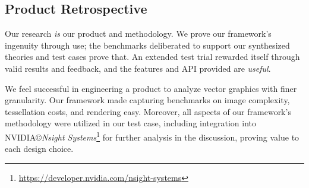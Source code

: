 \subsection{Product Retrospective}
Our research \emph{is} our product and methodology. We prove our framework's ingenuity through use; the benchmarks deliberated to support our synthesized theories and test cases prove that. An extended test trial rewarded itself through valid results and feedback, and the features and API provided are \emph{useful}.\medskip

We feel successful in engineering a product to analyze vector graphics with finer granularity. Our framework made capturing benchmarks on image complexity, tessellation costs, and rendering easy. Moreover, all aspects of our framework's methodology were utilized in our test case, including integration into NVIDIA\copyright \textit{Nsight Systems}\footnote{\href{https://developer.nvidia.com/nsight-systems}{https://developer.nvidia.com/nsight-systems}} for further analysis in the discussion, proving value to each design choice.